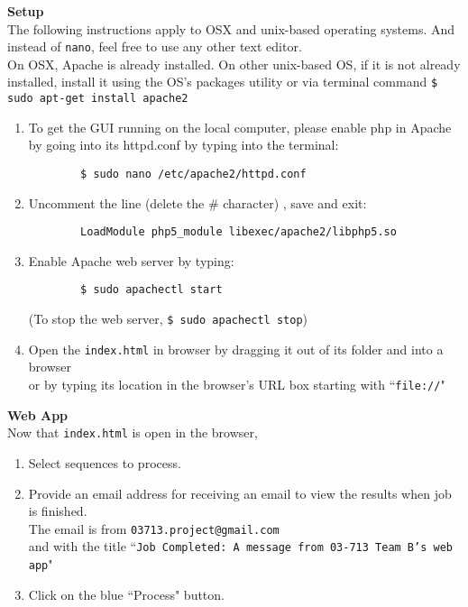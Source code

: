 \documentclass[11pt]{article}
\begin{document}
\textbf{Setup}\\
The following instructions apply to OSX and unix-based operating systems. And instead of \texttt{nano}, feel free to use any other text editor.\\
On OSX, Apache is already installed. On other unix-based OS, if it is not already installed, install it using the OS's packages utility or via terminal command \texttt{\$ sudo apt-get install apache2}\\
\begin{enumerate}
	\item To get the GUI running on the local computer, please enable php in Apache by going into its httpd.conf by typing into the terminal:
		\begin{verbatim}
		$ sudo nano /etc/apache2/httpd.conf
		\end{verbatim}
	\item Uncomment the line (delete the \# character) , save and exit:
		\begin{verbatim}
		LoadModule php5_module libexec/apache2/libphp5.so
		\end{verbatim}
	\item Enable Apache web server by typing:
		\begin{verbatim}
		$ sudo apachectl start
		\end{verbatim}
	(To stop the web server, \texttt{\$ sudo apachectl stop})
	\item Open the \texttt{index.html} in browser by dragging it out of its folder and into a browser
	\\or by typing its location in the browser's URL box starting with ``\texttt{file://}"
\end{enumerate}
\bigskip

\textbf{Web App}\\
Now that \texttt{index.html} is open in the browser,
\begin{enumerate}
	\item Select sequences to process.
	\item Provide an email address for receiving an email to view the results when job is finished.\\
		The email is from \texttt{03713.project@gmail.com}\\
		and with the title ``\texttt{Job Completed: A message from 03-713 Team B's web app}"
	\item Click on the blue ``Process" button.
\end{enumerate}
\bigskip
\end{document}
